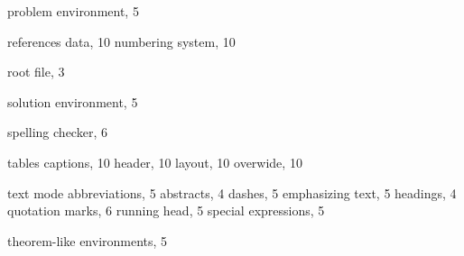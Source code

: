 \documentclass[graybox]{svmono}
\begin{document}
\begin{theindex}
\indexspace
\item problem environment, 5

\indexspace

\item references
\subitem data, 10
\subitem numbering system, 10

\indexspace
\item root file, 3
\indexspace

\item solution environment, 5
\item spelling checker, 6

\indexspace

\item tables
\subitem captions, 10
\subitem header, 10
\subitem layout, 10
\subitem overwide, 10

\item text mode
\subitem abbreviations, 5
\subitem abstracts, 4
\subitem dashes, 5
\subitem emphasizing text, 5
\subitem headings, 4
\subitem quotation marks, 6
\subitem running head, 5
\subitem special expressions, 5
\item theorem-like environments, 5

\vfill\eject

\end{theindex}
\end{document}
